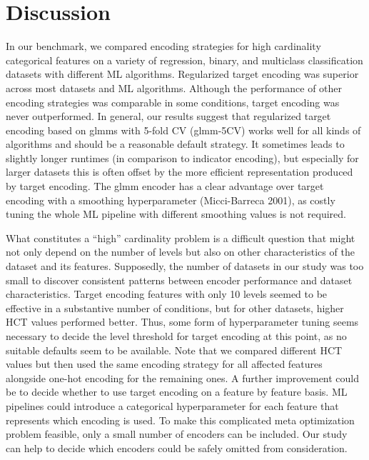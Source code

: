 \documentclass[smallextended]{svjour3}       %
\begin{document}
\hypertarget{discussion}{%
\section{Discussion}\label{discussion}}

In our benchmark, we compared encoding strategies for high cardinality categorical features on a variety of regression, binary, and multiclass classification datasets with different ML algorithms.
Regularized target encoding was superior across most datasets and ML algorithms.
Although the performance of other encoding strategies was comparable in some conditions, target encoding was never outperformed.
In general, our results suggest that regularized target encoding based on glmms with 5-fold CV (glmm-5CV) works well for all kinds of algorithms and should be a reasonable default strategy.
It sometimes leads to slightly longer runtimes (in comparison to indicator encoding), but especially for larger datasets this is often offset by the more efficient representation produced by target encoding.
The glmm encoder has a clear advantage over target encoding with a smoothing hyperparameter (Micci-Barreca 2001), as costly tuning the whole ML pipeline with different smoothing values is not required.

What constitutes a ``high'' cardinality problem is a difficult question that might not only depend on the number of levels but also on other characteristics of the dataset and its features.
Supposedly, the number of datasets in our study was too small to discover consistent patterns between encoder performance and dataset characteristics.
Target encoding features with only 10 levels seemed to be effective in a substantive number of conditions, but for other datasets, higher HCT values performed better.
Thus, some form of hyperparameter tuning seems necessary to decide the level threshold for target encoding at this point, as no suitable defaults seem to be available.
Note that we compared different HCT values but then used the same encoding strategy for all affected features alongside one-hot encoding for the remaining ones.
A further improvement could be to decide whether to use target encoding on a feature by feature basis.
ML pipelines could introduce a categorical hyperparameter for each feature that represents which encoding is used.
To make this complicated meta optimization problem feasible, only a small number of encoders can be included.
Our study can help to decide which encoders could be safely omitted from consideration.
\end{document}
